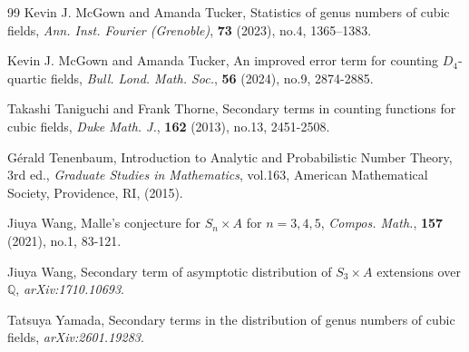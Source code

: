 \documentclass[11pt,reqno]{amsart}
\newcommand{\Q}{\mathbb{Q}}
\theoremstyle{definition}
\theoremstyle{remark}
\begin{document}
\begin{thebibliography}{99}
	Kevin J. McGown and Amanda Tucker,
	Statistics of genus numbers of cubic fields,
	\textit{Ann. Inst. Fourier (Grenoble)}, \textbf{73} (2023), no.4, 1365--1383.
	
	Kevin J. McGown and Amanda Tucker,
	An improved error term for counting $D_4$-quartic fields,
	\textit{Bull. Lond. Math. Soc.}, \textbf{56} (2024), no.9, 2874-2885.
	
	Takashi Taniguchi and Frank Thorne,
	Secondary terms in counting functions for cubic fields,
	\textit{Duke Math. J.}, \textbf{162} (2013), no.13, 2451-2508.
	
	G\'erald Tenenbaum,
	Introduction to Analytic and Probabilistic Number Theory,
	3rd ed.,
	\textit{Graduate Studies in Mathematics}, vol.163,
	American Mathematical Society, Providence, RI, (2015).
	
	Jiuya Wang,
	Malle's conjecture for $S_n \times A$ for $n=3,4,5$,
	\textit{Compos. Math.}, \textbf{157} (2021), no.1, 83-121.
	
	Jiuya Wang,
	Secondary term of asymptotic distribution of $S_3 \times A$ extensions over $\Q$, \textit{arXiv:1710.10693}.
	
	Tatsuya Yamada,
	Secondary terms in the distribution of genus numbers of cubic fields,
	\textit{arXiv:2601.19283}.
	
\end{thebibliography}
\end{document}

